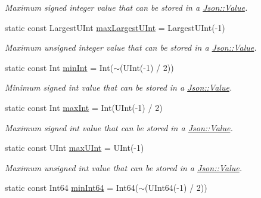 \begin{DoxyCompactItemize}
\begin{DoxyCompactList}\small\item\em Maximum signed integer value that can be stored in a \hyperlink{classJson_1_1Value}{Json\+::\+Value}. \end{DoxyCompactList}\item 
static const Largest\+U\+Int \hyperlink{classJson_1_1Value_a8ddb32d9d55fa5323ae5135639dc2e31}{max\+Largest\+U\+Int} = Largest\+U\+Int(-\/1)\hypertarget{classJson_1_1Value_a8ddb32d9d55fa5323ae5135639dc2e31}{}\label{classJson_1_1Value_a8ddb32d9d55fa5323ae5135639dc2e31}

\begin{DoxyCompactList}\small\item\em Maximum unsigned integer value that can be stored in a \hyperlink{classJson_1_1Value}{Json\+::\+Value}. \end{DoxyCompactList}\item 
static const Int \hyperlink{classJson_1_1Value_a7df8a39e2502b8c92a6a41e3d752d2c8}{min\+Int} = Int($\sim$(U\+Int(-\/1) / 2))\hypertarget{classJson_1_1Value_a7df8a39e2502b8c92a6a41e3d752d2c8}{}\label{classJson_1_1Value_a7df8a39e2502b8c92a6a41e3d752d2c8}

\begin{DoxyCompactList}\small\item\em Minimum signed int value that can be stored in a \hyperlink{classJson_1_1Value}{Json\+::\+Value}. \end{DoxyCompactList}\item 
static const Int \hyperlink{classJson_1_1Value_a978c799a8af3114ef7dab6fd0a310a1b}{max\+Int} = Int(U\+Int(-\/1) / 2)\hypertarget{classJson_1_1Value_a978c799a8af3114ef7dab6fd0a310a1b}{}\label{classJson_1_1Value_a978c799a8af3114ef7dab6fd0a310a1b}

\begin{DoxyCompactList}\small\item\em Maximum signed int value that can be stored in a \hyperlink{classJson_1_1Value}{Json\+::\+Value}. \end{DoxyCompactList}\item 
static const U\+Int \hyperlink{classJson_1_1Value_ac79e63ee68d3aa914bfd6988be669b87}{max\+U\+Int} = U\+Int(-\/1)\hypertarget{classJson_1_1Value_ac79e63ee68d3aa914bfd6988be669b87}{}\label{classJson_1_1Value_ac79e63ee68d3aa914bfd6988be669b87}

\begin{DoxyCompactList}\small\item\em Maximum unsigned int value that can be stored in a \hyperlink{classJson_1_1Value}{Json\+::\+Value}. \end{DoxyCompactList}\item 
static const Int64 \hyperlink{classJson_1_1Value_a815ef899bc312c93bc426511acfe31a7}{min\+Int64} = Int64($\sim$(U\+Int64(-\/1) / 2))\hypertarget{classJson_1_1Value_a815ef899bc312c93bc426511acfe31a7}{}\label{classJson_1_1Value_a815ef899bc312c93bc426511acfe31a7}


\end{DoxyCompactItemize}
